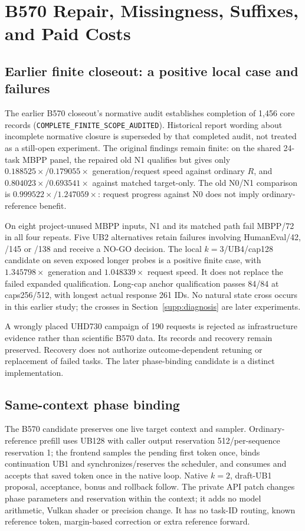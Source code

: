 \section{B570 Repair, Missingness, Suffixes, and Paid Costs}
\label{supp:b570}
\subsection{Earlier finite closeout: a positive local case and failures}
\label{supp:b570_old_closeout}
The earlier B570 closeout's normative audit establishes completion of 1,456 core records (\texttt{COMPLETE\_FINITE\_SCOPE\_AUDITED}). Historical report wording about incomplete normative closure is superseded by that completed audit, not treated as a still-open experiment. The original findings remain finite: on the shared 24-task MBPP panel, the repaired old N1 qualifies but gives only $0.188525\times/0.179055\times$ generation/request speed against ordinary $R$, and $0.804023\times/0.693541\times$ against matched target-only. The old N0/N1 comparison is $0.999522\times/1.247059\times$: request progress against N0 does not imply ordinary-reference benefit.

On eight project-unused MBPP inputs, N1 and its matched path fail MBPP/72 in all four repeats. Five UB2 alternatives retain failures involving HumanEval/42, /145 or /138 and receive a NO-GO decision. The local $k=3$/UB4/cap128 candidate on seven exposed longer probes is a positive finite case, with $1.345798\times$ generation and $1.048339\times$ request speed. It does not replace the failed expanded qualification. Long-cap anchor qualification passes 84/84 at caps256/512, with longest actual response 261 IDs. No natural state cross occurs in this earlier study; the crosses in Section~\ref{supp:diagnosis} are later experiments.

A wrongly placed UHD730 campaign of 190 requests is rejected as infrastructure evidence rather than scientific B570 data. Its records and recovery remain preserved. Recovery does not authorize outcome-dependent retuning or replacement of failed tasks. The later phase-binding candidate is a distinct implementation.

\subsection{Same-context phase binding}
\label{supp:b570_phase_binding}
The B570 candidate preserves one live target context and sampler. Ordinary-reference prefill uses UB128 with caller output reservation 512/per-sequence reservation 1; the frontend samples the pending first token once, binds continuation UB1 and synchronizes/reserves the scheduler, and consumes and accepts that saved token once in the native loop. Native $k=2$, draft-UB1 proposal, acceptance, bonus and rollback follow. The private API patch changes phase parameters and reservation within the context; it adds no model arithmetic, Vulkan shader or precision change. It has no task-ID routing, known reference token, margin-based correction or extra reference forward.

